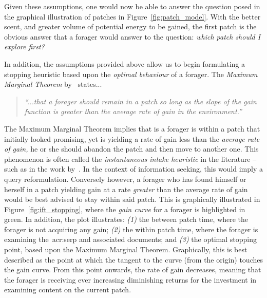 Given these assumptions, one would now be able to answer the question posed in the graphical illustration of patches in Figure~\ref{fig:patch_model}. With the better scent, and greater volume of potential energy to be gained, the first patch is the obvious answer that a forager would answer to the question: \emph{which patch should I explore first?}

In addition, the assumptions provided above allow us to begin formulating a stopping heuristic based upon the \emph{optimal behaviour} of a forager. The \emph{Maximum Marginal Theorem} by~\cite{charnov1976mvt} states...

\begin{quote}
    \emph{``...that a forager should remain in a patch so long as the slope of the gain function is greater than the average rate of gain in the environment.''}
\end{quote}

The Maximum Marginal Theorem implies that is a forager is within a patch that initially looked promising, yet is yielding a rate of gain less than the \emph{average rate of gain,} he or she should abandon the patch and then move to another one. This phenomenon is often called the \emph{instantaneous intake heuristic} in the literature -- such as in the work by~\cite{stephens1986foraging_theory}. In the context of information seeking, this would imply a query reformulation. Conversely however, a forager who has found himself or herself in a patch yielding gain at a rate \emph{greater} than the average rate of gain would be best advised to stay within said patch. This is graphically illustrated in Figure~\ref{fig:ift_stopping}, where the \emph{gain curve} for a forager is highlighted in {\color{dmax_green}green.} In addition, the plot illustrates: \emph{(1)} the between patch time, where the forager is not acquiring any gain; \emph{(2)} the within patch time, where the forager is examining the~\gls{acr:serp} and associated documents; and \emph{(3)} the optimal stopping point, based upon the Maximum Marginal Theorem. Graphically, this is best described as the point at which the tangent to the curve (from the origin) touches the gain curve. From this point onwards, the rate of gain decreases, meaning that the forager is receiving ever increasing diminishing returns for the investment in examining content on the current patch.

